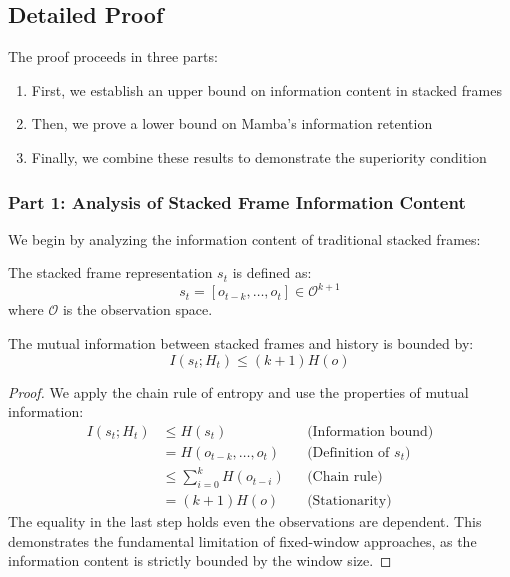 \subsection{Detailed Proof}

The proof proceeds in three parts:
\begin{enumerate}
    \item First, we establish an upper bound on information content in stacked frames
    \item Then, we prove a lower bound on Mamba's information retention
    \item Finally, we combine these results to demonstrate the superiority condition
\end{enumerate}

\subsubsection{Part 1: Analysis of Stacked Frame Information Content}

We begin by analyzing the information content of traditional stacked frames:

\begin{definition}
The stacked frame representation $s_t$ is defined as:
\begin{equation}
    s_t = [o_{t-k}, \ldots, o_t] \in \mathcal{O}^{k+1}
\end{equation}
where $\mathcal{O}$ is the observation space.
\end{definition}

\begin{lemma}
The mutual information between stacked frames and history is bounded by:
\begin{equation}
    I(s_t; H_t) \leq (k + 1)H(o)
\end{equation}
\end{lemma}

\begin{proof}
We apply the chain rule of entropy and use the properties of mutual information:
\begin{align}
    I(s_t; H_t) &\leq H(s_t) && \text{(Information bound)} \\
    &= H(o_{t-k}, \ldots, o_t) && \text{(Definition of $s_t$)} \\
    &\leq \sum_{i=0}^k H(o_{t-i}) && \text{(Chain rule)} \\
    &= (k + 1)H(o) && \text{(Stationarity)}
\end{align}
The equality in the last step holds even the observations are dependent. This demonstrates the fundamental limitation of fixed-window approaches, as the information content is strictly bounded by the window size.
\end{proof}

